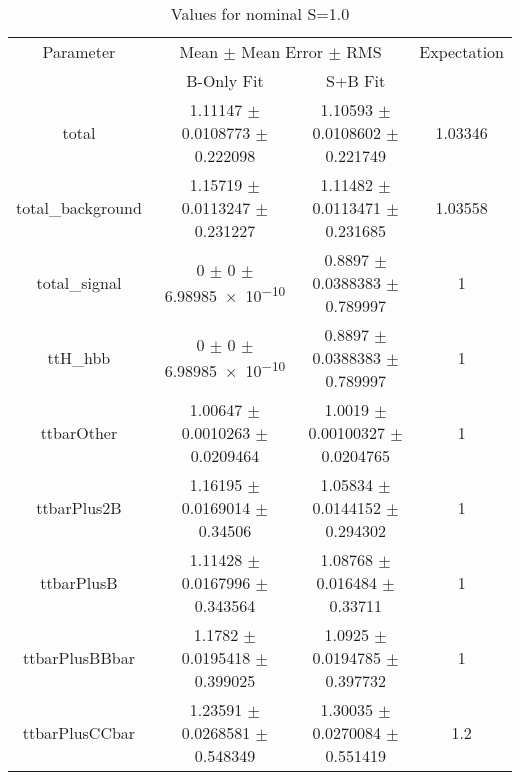 \begin{table}
\centering
\caption{Values for nominal S=1.0}
\begin{tabular}{cccc}
\toprule
Parameter & \multicolumn{2}{c}{Mean $\pm$ Mean Error $\pm$ RMS} & Expectation\\
 & B-Only Fit & S+B Fit & \\
\midrule
total & \num{1.11147} $\pm$ \num{0.0108773} $\pm$ \num{0.222098} & \num{1.10593} $\pm$ \num{0.0108602} $\pm$ \num{0.221749} & \num{1.03346}\\
total\_background & \num{1.15719} $\pm$ \num{0.0113247} $\pm$ \num{0.231227} & \num{1.11482} $\pm$ \num{0.0113471} $\pm$ \num{0.231685} & \num{1.03558}\\
total\_signal & \num{0} $\pm$ \num{0} $\pm$ \num{6.98985e-10} & \num{0.8897} $\pm$ \num{0.0388383} $\pm$ \num{0.789997} & \num{1}\\
ttH\_hbb & \num{0} $\pm$ \num{0} $\pm$ \num{6.98985e-10} & \num{0.8897} $\pm$ \num{0.0388383} $\pm$ \num{0.789997} & \num{1}\\
ttbarOther & \num{1.00647} $\pm$ \num{0.0010263} $\pm$ \num{0.0209464} & \num{1.0019} $\pm$ \num{0.00100327} $\pm$ \num{0.0204765} & \num{1}\\
ttbarPlus2B & \num{1.16195} $\pm$ \num{0.0169014} $\pm$ \num{0.34506} & \num{1.05834} $\pm$ \num{0.0144152} $\pm$ \num{0.294302} & \num{1}\\
ttbarPlusB & \num{1.11428} $\pm$ \num{0.0167996} $\pm$ \num{0.343564} & \num{1.08768} $\pm$ \num{0.016484} $\pm$ \num{0.33711} & \num{1}\\
ttbarPlusBBbar & \num{1.1782} $\pm$ \num{0.0195418} $\pm$ \num{0.399025} & \num{1.0925} $\pm$ \num{0.0194785} $\pm$ \num{0.397732} & \num{1}\\
ttbarPlusCCbar & \num{1.23591} $\pm$ \num{0.0268581} $\pm$ \num{0.548349} & \num{1.30035} $\pm$ \num{0.0270084} $\pm$ \num{0.551419} & \num{1.2}\\
\bottomrule
\end{tabular}
\end{table}